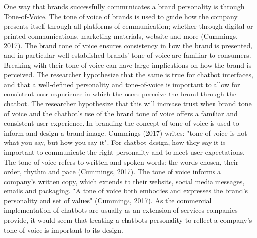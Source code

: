 One way that brands successfully communicates a brand personality is through Tone-of-Voice. The tone of voice of brands is used to guide how the company presents itself through all platforms of communication; whether through digital or printed communications, marketing materials, website and more (Cummings, 2017). The brand tone of voice ensures consistency in how the brand is presented, and in particular well-established brands' tone of voice are familiar to consumers. Breaking with their tone of voice can have large implications on how the brand is perceived. The researcher hypothesize that the same is true for chatbot interfaces, and that a well-defined personality and tone-of-voice is important to allow for consistent user experience in which the users perceive the brand through the chatbot. The researcher hypothesize that this will increase trust when brand tone of voice and the chatbot's use of the brand tone of voice offers a familiar and consistent user experience. In branding the concept of tone of voice is used to inform and design a brand image. Cummings (2017) writes: "tone of voice is not what you say, but how you say it". For chatbot design, how they say it is important to communicate the right personality and to meet user expectations. The tone of voice refers to written and spoken words: the words chosen, their order, rhythm and pace (Cummings, 2017). The tone of voice informs a company's written copy, which extends to their website, social media messages, emails and packaging. "A tone of voice both embodies and expresses the brand's personality and set of values" (Cummings, 2017). As the commercial implementation of chatbots are usually as an extension of services companies provide, it would seem that treating a chatbots personality to reflect a company's tone of voice is important to its design. 

